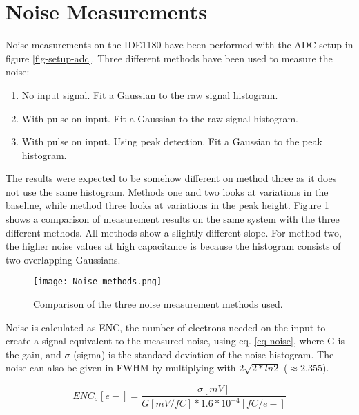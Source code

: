 \documentclass[../main/thesis.tex]{subfiles}
\begin{document}
\section{Noise Measurements}
\label{ide-noise}

Noise measurements on the IDE1180 have been performed with the ADC setup in figure \ref{fig-setup-adc}. Three different methods have been used to measure the noise:
\begin{enumerate}  
	\item No input signal. Fit a Gaussian to the raw signal histogram. 
	\item With pulse on input. Fit a Gaussian to the raw signal histogram.  
	\item With pulse on input. Using peak detection. Fit a Gaussian to the peak histogram.   
\end{enumerate}

The results were expected to be somehow different on method three as it does not use the same histogram. Methods one and two looks at variations in the baseline, while method three looks at variations in the peak height. Figure \ref{fig-noise-methods} shows a comparison of measurement results on the same system with the three different methods. All methods show a slightly different slope. For method two, the higher noise values at high capacitance is because the histogram consists of two overlapping Gaussians.  %

\begin{figure}%
	\centering
	\texttt{[image: Noise-methods.png]}
	\caption{Comparison of the three noise measurement methods used.}
	\label{fig-noise-methods}
\end{figure} 

Noise is calculated as \gls{ENC}, the number of electrons needed on the input to create a signal equivalent to the measured noise, using eq. \ref{eq-noise}, where G is the gain, and $\sigma$ (sigma) is the standard deviation of the noise histogram. The noise can also be given in \gls{FWHM} by multiplying with $2\sqrt{2*ln2}$ ($\approx 2.355$). 

\begin{equation}%
ENC_\sigma [e-] = \frac{\sigma [mV]}{G [mV/fC]*1.6*10^{-4} [fC/e-]}
\label{eq-noise}
\end{equation}
\end{document}
